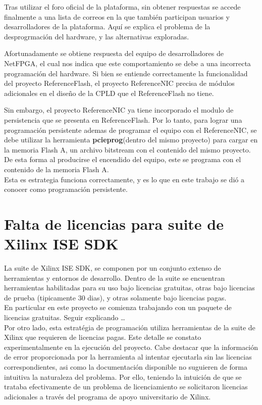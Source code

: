Tras utilizar el foro oficial de la plataforma, sin obtener respuestas se accede finalmente a una lista de correos en la que tambi\'en participan usuarios y desarrolladores de la plataforma. Aquí se explica el problema de la desprogrmaci\'on del hardware, y las alternativas exploradas. 

Afortunadamente se obtiene respuesta del equipo de desarrolladores de NetFPGA, el cual nos indica que este comportamiento se debe a una incorrecta programaci\'on del hardware. Si bien se entiende correctamente la funcionalidad del proyecto ReferenceFlash, el proyecto ReferenceNIC precisa de módulos adicionales en el diseño de la CPLD que el ReferenceFlash no tiene. 

Sin embargo, el proyecto ReferenceNIC ya tiene incorporado el modulo de persistencia que se presenta en ReferenceFlash. Por lo tanto, para lograr una programaci\'on persistente ademas de programar el equipo con el ReferenceNIC, se debe utilizar la herramienta \textbf{pcieprog}(dentro del mismo proyecto) para cargar en la memoria Flash A, un archivo bitstream con el contenido del mismo proyecto. De esta forma al producirse el encendido del equipo, este se programa con el contenido de la memoria Flash A.\\ 

Esta es estrategia funciona correctamente, y es lo que en este trabajo se di\'o a conocer como programación persistente.

\section{Falta de licencias para suite de Xilinx ISE SDK}
\label{apendiceB3}

La suite de Xilinx ISE SDK, se componen por un conjunto extenso de herramientas y entornos de desarrollo. Dentro de la suite se encuentran herramientas habilitadas para su uso bajo licencias gratuitas, otras bajo licencias de prueba (tipicamente 30 dias), y otras solamente bajo licencias pagas.\\

En particular en este proyecto se comienza trabajando con un paquete de licencias gratuitas. Seguir explicando \dots\\

Por otro lado, esta estrat\'egia de programaci\'on utiliza herramientas de la suite de Xilinx que requieren de licencias pagas. Este detalle se constato experimentalmente en la ejecuci\'on del proyecto. Cabe destacar que la informaci\'on de error proporcionada por la herramienta al intentar ejecutarla sin las licencias correspondientes, asi como la documentaci\'on disponible no suguieren de forma intuitiva la naturaleza del problema. Por ello, teniendo la intuici\'on de que se trataba efectivamente de un problema de licenciamiento se solicitaron licencias adicionales a trav\'es del programa de apoyo universitario de Xilinx.

